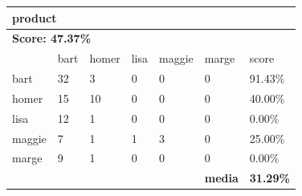 \documentclass[paper=a4, fontsize=11pt]{scrartcl} %
\numberwithin{equation}{section} %
\numberwithin{figure}{section} %
\numberwithin{table}{section} %
\begin{document}
\begin{table}[]
\begin{tabular}{l|l|l|l|l|l|l}
\multicolumn{7}{l}{\textbf{product}}                                                        \\ \hline
\multicolumn{7}{l}{\textbf{Score: 47.37\%}}                                                 \\ \hline
          & bart      & homer     & lisa      & maggie    & marge          & score            \\ \hline
bart      & 32        & 3         & 0         & 0         & 0              & 91.43\%          \\ \hline
homer     & 15        & 10        & 0         & 0         & 0              & 40.00\%          \\ \hline
lisa      & 12        & 1         & 0         & 0         & 0              & 0.00\%           \\ \hline
maggie    & 7         & 1         & 1         & 3         & 0              & 25.00\%          \\ \hline
marge     & 9         & 1         & 0         & 0         & 0              & 0.00\%           \\ \hline
\textbf{} & \textbf{} & \textbf{} & \textbf{} & \textbf{} & \textbf{media} & \textbf{31.29\%} \\ \hline
\end{tabular}
\end{table}
\end{document}
